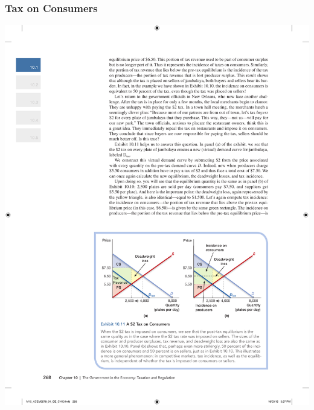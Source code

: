 \documentclass[12pt, xcolor=dvipsnames]{beamer}
\begin{document}
\begin{frame}
\frametitle{\bf Tax on Consumers}
\begin{center}
\includegraphics[height=.85\textheight]{figures/8.pdf}
\end{center}
\end{frame}
\end{document}
